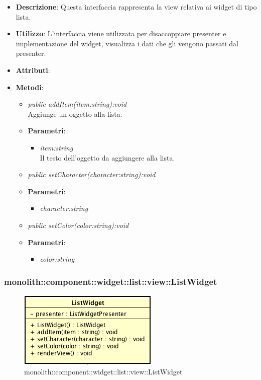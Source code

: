\begin{itemize}
\item \textbf{Descrizione}: Questa interfaccia rappresenta la view relativa ai widget di tipo lista.
\item \textbf{Utilizzo}: L'interfaccia viene utilizzata per disaccoppiare presenter e implementazione del widget, visualizza i dati che gli vengono passati dal presenter.
\item \textbf{Attributi}:
\item \textbf{Metodi}:
	\begin{itemize}
	\item \textit{public addItem(item:string):void}\\
	Aggiunge un oggetto alla lista.
		\item{\textbf{Parametri}: \begin{itemize}
		\item \textit{item:string}\\
		Il testo dell'oggetto da aggiungere alla lista.
		\end{itemize}}
	\item \textit{public setCharacter(character:string):void}\\

		\item{\textbf{Parametri}: \begin{itemize}
		\item \textit{character:string}\\

		\end{itemize}}
	\item \textit{public setColor(color:string):void}\\

		\item{\textbf{Parametri}: \begin{itemize}
		\item \textit{color:string}\\

		\end{itemize}}
	\end{itemize}
\end{itemize}

\subsubsection{monolith::component::widget::list::view::ListWidget}

\label{monolith::component::widget::list::view::ListWidget}
\begin{figure}[ht]
	\centering
	\includegraphics[scale=0.5]{Sezioni/SottosezioniST/img/ListWidget.png}
	\caption{monolith::component::widget::list::view::ListWidget}
\end{figure}


